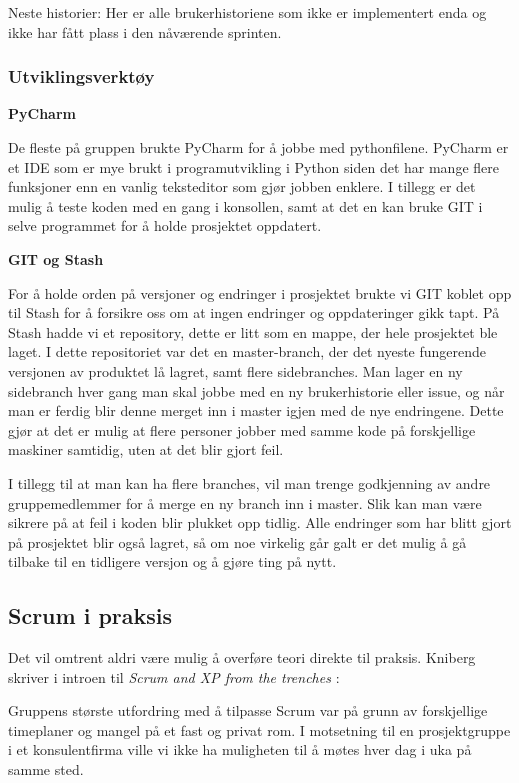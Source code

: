 \documentclass[12pt,a4paper,norsk]{article}
\begin{document}
    Neste historier:
    Her er alle brukerhistoriene som ikke er implementert enda og ikke har fått plass i den nåværende sprinten.
    
    \cite [side 72 -78]{kniberg}


	\subsubsection{Utviklingsverktøy}

\textbf{PyCharm}
\par De fleste på gruppen brukte PyCharm for å jobbe med pythonfilene. PyCharm er et IDE som er mye brukt i programutvikling i Python siden det har mange flere funksjoner enn en vanlig teksteditor som gjør jobben enklere. I tillegg er det mulig å teste koden med en gang i konsollen, samt at det en kan bruke GIT i selve programmet for å holde prosjektet oppdatert.

\bigskip \noindent \textbf{GIT og Stash}
\par For å holde orden på versjoner og endringer i prosjektet brukte vi GIT koblet opp til Stash for å forsikre oss om at ingen endringer og oppdateringer gikk tapt. På Stash hadde vi et repository, dette er litt som en mappe, der hele prosjektet ble laget. I dette repositoriet var det en master-branch, der det nyeste fungerende versjonen av produktet lå lagret, samt flere sidebranches. Man lager en ny sidebranch hver gang man skal jobbe med en ny brukerhistorie eller issue, og når man er ferdig blir denne merget inn i master igjen med de nye endringene. Dette gjør at det er mulig at flere personer jobber med samme kode på forskjellige maskiner samtidig, uten at det blir gjort feil.

I tillegg til at man kan ha flere branches, vil man trenge godkjenning av andre gruppemedlemmer for å merge en ny branch inn i master. Slik kan man være sikrere på at feil i koden blir plukket opp tidlig. Alle endringer som har blitt gjort på prosjektet blir også lagret, så om noe virkelig går galt er det mulig å gå tilbake til en tidligere versjon og å gjøre ting på nytt.


	\subsection{Scrum i praksis}
    Det vil omtrent aldri være mulig å overføre teori direkte til praksis. Kniberg skriver i introen til \textit{Scrum and XP from the trenches} \cite[side 2]{kniberg}:
    
    \bigskip\begin{adjustwidth}{2.5em}{0pt}
    \end{adjustwidth}
    \bigskip Gruppens største utfordring med å tilpasse Scrum var på grunn av forskjellige timeplaner og mangel på et fast og privat rom. I motsetning til en prosjektgruppe i et konsulentfirma ville vi ikke ha muligheten til å møtes hver dag i uka på samme sted.
	
\end{document}
